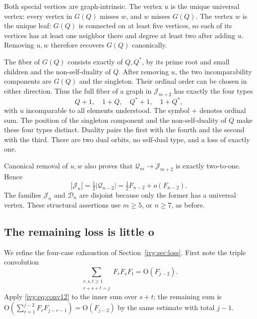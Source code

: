\documentclass[11pt,letterpaper]{article}
\theoremstyle{definition}\newtheorem{definition}[theorem]{Definition}
\theoremstyle{remark}\newtheorem{remark}[theorem]{Remark}
\newcommand{\OO}{\mathrm O}
\begin{document}
Both special vertices are graph-intrinsic. The vertex $u$ is the unique universal vertex: every vertex in $G(Q)$ misses $w$, and $w$ misses $G(Q)$. The vertex $w$ is the unique leaf: $G(Q)$ is connected on at least five vertices, so each of its vertices has at least one neighbor there and degree at least two after adding $u$. Removing $u,w$ therefore recovers $G(Q)$ canonically.

The fiber of $G(Q)$ consists exactly of $Q,Q^*$, by its prime root and small children and the non-self-duality of $Q$. After removing $u$, the two incomparability components are $G(Q)$ and the singleton. Their ordinal order can be chosen in either direction. Thus the full fiber of a graph in $\mathcal J_{m+2}$ has exactly the four types
\[
 Q+1,\quad 1+Q,\quad Q^*+1,\quad 1+Q^*,
\]
with $u$ incomparable to all elements understood. The symbol $+$ denotes ordinal sum. The position of the singleton component and the non-self-duality of $Q$ make these four types distinct. Duality pairs the first with the fourth and the second with the third. There are two dual orbits, no self-dual type, and a loss of exactly one.

Canonical removal of $u,w$ also proves that $\mathcal Q_m\to\mathcal J_{m+2}$ is exactly two-to-one. Hence
\begin{equation}\label{ivg:eq:Jfamily}
 |\mathcal J_n|=\tfrac12|\mathcal Q_{n-2}|
 =\tfrac12F_{n-2}+o(F_{n-2}).
\end{equation}
The families $\mathcal J_n$ and $\mathcal D_n$ are disjoint because only the former has a universal vertex. These structural assertions use $m\ge5$, or $n\ge7$, as before.

\subsection{The remaining loss is little o}
We refine the four-case exhaustion of Section~\ref{ivg:sec:loss}. First note the triple convolution
\begin{equation}\label{ivg:eq:triple}
 \sum_{\substack{r,s,t\ge1\\ r+s+t=j}}F_rF_sF_t=\OO(F_{j-2}).
\end{equation}
Apply \eqref{ivg:eq:conv12} to the inner sum over $s+t$; the remaining sum is $\OO(\sum_{r=1}^{j-2}F_rF_{j-r-1})=\OO(F_{j-2})$ by the same estimate with total $j-1$.
\end{document}
